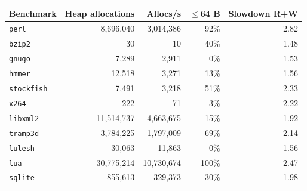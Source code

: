 \begin{tabular}{lrrrr}
\toprule
Benchmark & Heap allocations & Allocs/s & $\le$64 B & Slowdown R+W \\
\midrule
\texttt{perl} & 8,696,040 & 3,014,386 & 92\% & 2.82 \\
\texttt{bzip2} & 30 & 10 & 40\% & 1.48 \\
\texttt{gnugo} & 7,289 & 2,911 & 0\% & 1.53 \\
\texttt{hmmer} & 12,518 & 3,271 & 13\% & 1.56 \\
\texttt{stockfish} & 7,491 & 3,218 & 51\% & 2.33 \\
\texttt{x264} & 222 & 71 & 3\% & 2.22 \\
\texttt{libxml2} & 11,514,737 & 4,663,675 & 15\% & 1.92 \\
\texttt{tramp3d} & 3,784,225 & 1,797,009 & 69\% & 2.14 \\
\texttt{lulesh} & 30,063 & 11,863 & 0\% & 1.56 \\
\texttt{lua} & 30,775,214 & 10,730,674 & 100\% & 2.47 \\
\texttt{sqlite} & 855,613 & 329,373 & 30\% & 1.98 \\
\bottomrule
\end{tabular}
